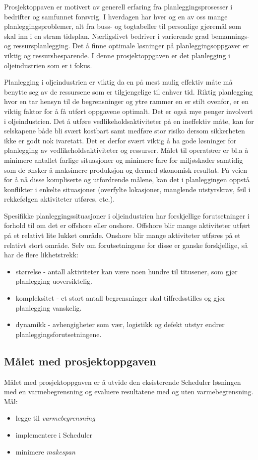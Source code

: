 Prosjektoppaven er motivert av generell erfaring fra planleggingsprosesser i bedrifter og samfunnet forøvrig. I hverdagen har hver og en av oss mange planleggingsproblemer, alt fra buss- og togtabeller til personlige gjøremål som skal inn i en stram tidsplan. Nærligslivet  bedriver i varierende grad bemannings- og ressursplanlegging. Det å finne optimale løsninger på planleggingsoppgaver er viktig og ressursbesparende. I denne prosjektoppgaven er det planlegging i oljeindustrien som er i fokus.

Planlegging i oljeindustrien er viktig da en på mest mulig effektiv måte må benytte seg av de ressursene som er tilgjengelige til enhver tid. Riktig planlegging hvor en tar hensyn til de begrensninger og ytre rammer en er stilt ovenfor, er en viktig faktor for å få utført oppgavene optimalt. Det er også mye penger involvert i oljeindustrien. Det å utføre vedlikeholdsaktiviteter på en ineffektiv måte, kan for selskapene både bli svært kostbart samt medføre stor risiko dersom sikkerheten ikke er godt nok ivaretatt. Det er derfor svært viktig å ha gode løsninger for planlegging av vedlikeholdsaktiviteter og ressurser. Målet til operatører er bl.a å minimere antallet farlige situasjoner og minimere fare for miljøskader samtidig som de ønsker å maksimere produksjon og dermed økonomisk resultat. På veien for å nå disse kompliserte og utfordrende målene, kan det i planleggingen oppstå konflikter i enkelte situasjoner (overfylte lokasjoner, manglende utstyrskrav, feil i rekkefølgen aktiviteter utføres, etc.).

Spesifikke planleggingssituasjoner i oljeindustrien har forskjellige forutsetninger i forhold til om det er offshore eller onshore. Offshore blir mange aktiviteter utført på et relativt lite lukket område. Onshore blir mange aktiviteter utføres på et relativt stort område. Selv om forutsetningene for disse er ganske forskjellige, så har de flere likhetstrekk:
\begin{itemize}
\item størrelse - antall aktiviteter kan være noen hundre til titusener, som gjør planlegging uoversiktelig.
\item kompleksitet - et stort antall begrensninger skal tilfredsstilles og gjør planlegging vanskelig.
\item dynamikk - avhengigheter som vær, logistikk og defekt utstyr endrer planleggingsforutsetningene.
\end{itemize}

\subsection{Målet med prosjektoppgaven}
Målet med prosjektoppgaven er å utvide den eksisterende Scheduler løsningen med en varmebegrensning og evaluere resultatene med og uten varmebegrensning. Mål:
\begin{itemize}
\item legge til \textit{varmebegrensning}
\item implementere i Scheduler
\item minimere \textit{makespan}
\end{itemize}

